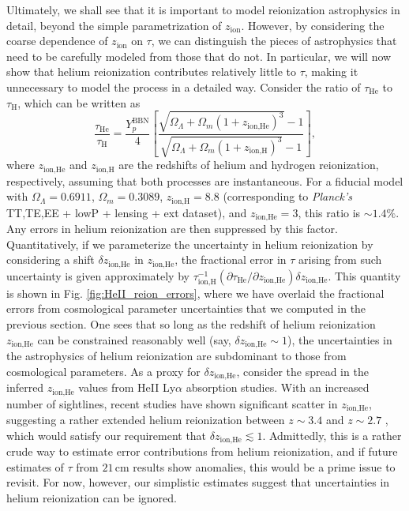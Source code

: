 \documentclass[twocolumn,aps,prd,nofootinbib,showpacs]{revtex4-1}
\begin{document}
Ultimately, we shall see that it is important to model reionization astrophysics in detail, beyond the simple parametrization of $z_\textrm{ion}$. However, by considering the coarse dependence of $z_\textrm{ion}$ on $\tau$, we can distinguish the pieces of astrophysics that need to be carefully modeled from those that do not. In particular, we will now show that helium reionization contributes relatively little to $\tau$, making it unnecessary to model the process in a detailed way. Consider the ratio of $\tau_\textrm{He}$ to $\tau_\textrm{H}$, which can be written as
\begin{equation}
\frac{\tau_\textrm{He}}{\tau_\textrm{H}} = \frac{Y_p^\textrm{BBN}}{4} \left[ \frac{ \sqrt{\Omega_\Lambda + \Omega_m (1+z_\textrm{ion,He})^3} - 1}{ \sqrt{\Omega_\Lambda + \Omega_m (1+z_\textrm{ion,H})^3} - 1}\right],
\end{equation}
where $z_\textrm{ion,He}$ and $z_\textrm{ion,H}$ are the redshifts of helium and hydrogen reionization, respectively, assuming that both processes are instantaneous. For a fiducial model with $\Omega_\Lambda = 0.6911$, $\Omega_m = 0.3089$, $z_\textrm{ion,H} = 8.8$ (corresponding to \emph{Planck's} TT,TE,EE + lowP + lensing + ext dataset), and $z_\textrm{ion,He} = 3$, this ratio is $\sim 1.4\%$. Any errors in helium reionization are then suppressed by this factor. Quantitatively, if we parameterize the uncertainty in helium reionization by considering a shift $\delta z_\textrm{ion,He}$ in $z_\textrm{ion,He}$, the fractional error in $\tau$ arising from such uncertainty is given approximately by $\tau_\textrm{ion,H}^{-1} (\partial \tau_\textrm{He} / \partial z_\textrm{ion,He}) \delta z_\textrm{ion,He}$. This quantity is shown in Fig. \ref{fig:HeII_reion_errors}, where we have overlaid the fractional errors from cosmological parameter uncertainties that we computed in the previous section. One sees that so long as the redshift of helium reionization $z_\textrm{ion,He}$ can be constrained reasonably well (say, $ \delta z_\textrm{ion,He} \sim 1$), the uncertainties in the astrophysics of helium reionization are subdominant to those from cosmological parameters. As a proxy for $ \delta z_\textrm{ion,He} $, consider the spread in the inferred $z_\textrm{ion,He}$ values from HeII Ly$\alpha$ absorption studies. With an increased number of sightlines, recent studies have shown significant scatter in $z_\textrm{ion,He}$, suggesting a rather extended helium reionization between $z \sim 3.4$ and $z \sim 2.7$ \cite{worseck_et_al2014}, which would satisfy our requirement that $ \delta z_\textrm{ion,He} \lesssim 1$. Admittedly, this is a rather crude way to estimate error contributions from helium reionization, and if future estimates of $\tau$ from $21\,\textrm{cm}$ results show anomalies, this would be a prime issue to revisit. For now, however, our simplistic estimates suggest that uncertainties in helium reionization can be ignored.
\end{document}
